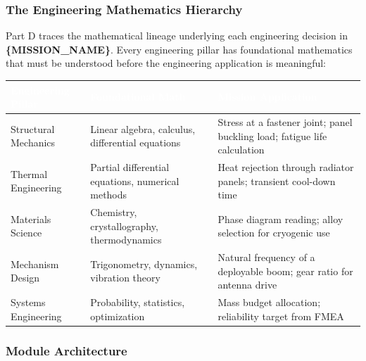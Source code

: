 \documentclass[11pt,letterpaper]{article}
\newcommand{\param}[1]{\textcolor{paramred}{\textbf{\{#1\}}}}
\newcommand{\tableheader}[1]{\textbf{\sffamily\textcolor{white}{#1}}}
\begin{document}
\subsubsection{The Engineering Mathematics Hierarchy}

Part D traces the mathematical lineage underlying each engineering decision in \param{MISSION\_NAME}. Every engineering pillar has foundational mathematics that must be understood before the engineering application is meaningful:

\begin{center}
\begin{tabularx}{\textwidth}{L{3cm}L{4cm}X}
\toprule
{}
\tableheader{Engineering Pillar} & \tableheader{Foundational Math} & \tableheader{Mission Application} \\
\midrule
Structural Mechanics & Linear algebra, calculus, differential equations & Stress at a fastener joint; panel buckling load; fatigue life calculation \\
Thermal Engineering & Partial differential equations, numerical methods & Heat rejection through radiator panels; transient cool-down time \\
Materials Science & Chemistry, crystallography, thermodynamics & Phase diagram reading; alloy selection for cryogenic use \\
Mechanism Design & Trigonometry, dynamics, vibration theory & Natural frequency of a deployable boom; gear ratio for antenna drive \\
Systems Engineering & Probability, statistics, optimization & Mass budget allocation; reliability target from FMEA \\
\bottomrule
\end{tabularx}
\end{center}

\subsubsection{Module Architecture}
\end{document}
